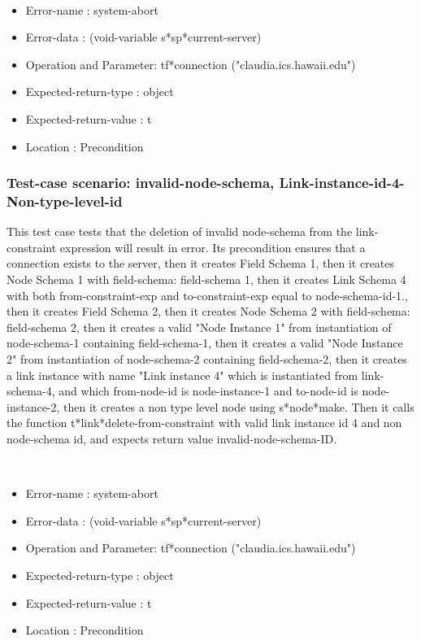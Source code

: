 \
\begin {itemize}
\item 	Error-name             : system-abort
\item Error-data             : (void-variable s*sp*current-server)
\item Operation and Parameter: tf*connection ("claudia.ics.hawaii.edu")
\item Expected-return-type   : object
\item Expected-return-value  : t
\item Location               : Precondition



\end {itemize}
\subsubsection {Test-case scenario: invalid-node-schema, Link-instance-id-4-Non-type-level-id}


This test case tests that the deletion of invalid node-schema from the link-constraint expression  will result in error.
Its precondition ensures that a connection exists to the server, then it creates Field Schema 1, then it creates Node Schema 1 with field-schema: field-schema 1, then it creates Link Schema 4 with both  from-constraint-exp and to-constraint-exp equal to node-schema-id-1., then it creates Field Schema 2, then it creates Node Schema 2 with field-schema: field-schema 2, then it creates a valid "Node Instance 1" from instantiation of node-schema-1 containing field-schema-1, then it creates a valid "Node Instance 2" from instantiation of node-schema-2 containing field-schema-2, then it creates a link instance with name "Link instance 4" which is instantiated from link-schema-4, and which  from-node-id is node-instance-1 and to-node-id is node-instance-2, then it creates a non type level node using s*node*make.
Then it calls the function t*link*delete-from-constraint  with  valid link instance id 4 and non node-schema id, and expects return value invalid-node-schema-ID.



\
\begin {itemize}
\item 	Error-name             : system-abort
\item Error-data             : (void-variable s*sp*current-server)
\item Operation and Parameter: tf*connection ("claudia.ics.hawaii.edu")
\item Expected-return-type   : object
\item Expected-return-value  : t
\item Location               : Precondition



\end {itemize}
